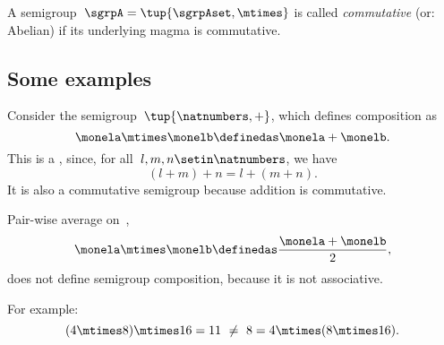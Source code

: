 \begin{definition}\label{def:commutative-semigroup}
    A semigroup~$\sgrpA = \tup{\sgrpAset, \mtimes}$ is called \emph{commutative} (or: Abelian) if its underlying magma is commutative.
\end{definition}

\subsection{Some examples}

\begin{example}
    \label{exa:natnum-semigroup}
    Consider the semigroup~$\tup{\natnumbers,+}$, which defines composition as
    \begin{equation}
        \label{eq:natnum-semigroup-definition}
        \monela \mtimes \monelb \definedas  \monela + \monelb.
    \end{equation}
    This is a , since, for all~$l,m, n \setin \natnumbers$, we have
    \begin{equation}
        (l+m)
        +n = l+(m+n).
    \end{equation}
    It is also a commutative semigroup because addition is commutative.
\end{example}

\begin{example}
    Pair-wise average on~\reals,
    \begin{equation}
        \label{eq:pairwise}
        \monela \mtimes \monelb \definedas  \frac{\monela + \monelb}{2},
    \end{equation}
    does not define semigroup composition, because it is not associative.

    For example:
    \begin{equation}
        \label{eq:pairwise-counterexample}
        (4 \mtimes 8) \mtimes 16 = 11\  \neq\   8 = 4 \mtimes (8 \mtimes 16).
    \end{equation}
\end{example}


